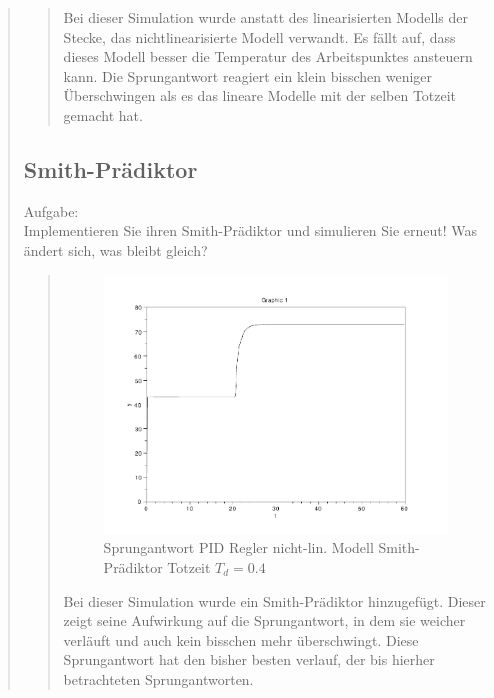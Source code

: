\begin{quote}
\begin{quote}
        Bei dieser Simulation wurde anstatt des linearisierten Modells der Stecke, das nichtlinearisierte Modell
        verwandt. Es fällt auf, dass dieses Modell besser die Temperatur des Arbeitspunktes ansteuern kann. Die
        Sprungantwort reagiert ein klein bisschen weniger Überschwingen als es das lineare Modelle mit der selben
        Totzeit gemacht hat.\\
        \vspace{1em}
        
        
    \end{quote}
    
    \subsection{Smith-Prädiktor}
    Aufgabe:\\
    Implementieren Sie ihren Smith-Prädiktor und simulieren Sie erneut! Was ändert sich, was bleibt gleich?\vspace{1em}
    
    \begin{quote}
        \begin{figure}[H]
        \centering
            \includegraphics[scale=0.7, trim = 0cm 0cm 0cm 0cm, clip]{./Bilder/4_3_Td_04}
               \caption{Sprungantwort PID Regler nicht-lin. Modell Smith-Prädiktor Totzeit $T_d = 0.4$}
        \end{figure}
        
        Bei dieser Simulation wurde ein Smith-Prädiktor hinzugefügt. Dieser zeigt seine Aufwirkung auf die
        Sprungantwort, in dem sie weicher verläuft und auch kein bisschen mehr überschwingt. Diese Sprungantwort hat den
        bisher besten verlauf, der bis hierher betrachteten Sprungantworten.\\
        \vspace{1em}
        

\end{quote}
\end{quote}
